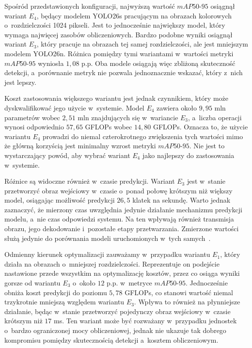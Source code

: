 Spośród przedstawionych konfiguracji, najwyższą wartość $mAP50\text{-}95$ osiągnął wariant $E_4$, będący modelem YOLO26s pracującym na obrazach kolorowych o~rozdzielczości 1024 pikseli. Jest to jednocześnie największy model, który wymaga najwięcej zasobów obliczeniowych. Bardzo podobne wyniki osiągnął wariant $E_3$, który pracuje na obrazach tej samej rozdzielczości, ale jest mniejszym modelem YOLO26n. Różnica pomiędzy tymi wariantami w~wartości metryki $mAP50\text{-}95$ wyniosła $1,08$ p.p. Oba modele osiągają więc zbliżoną skuteczność detekcji, a~porównanie metryk nie pozwala jednoznacznie wskazać, który z~nich jest lepszy.

Koszt zastosowania większego wariantu jest jednak czynnikiem, który może dyskwalifikować jego użycie w~systemie. Model $E_4$ zawiera około $9,95$ mln parametrów wobec $2,51$ mln znajdujących się w~wariancie $E_3$, a~liczba operacji wynosi odpowiednio $57,65$ GFLOPs wobec $14,80$ GFLOPs. Oznacza to, że użycie wariantu $E_4$ prowadzi do niemal czterokrotnego zwiększenia tych wartości mimo że główną korzyścią jest minimalny wzrost metryki $mAP50\text{-}95$. Nie jest to wystarczający powód, aby wybrać wariant $E_4$ jako najlepszy do zastosowania w~systemie.

Różnice są widoczne również w~czasie predykcji. Wariant $E_3$ jest w~stanie przetworzyć obraz wejściowy w~czasie o~ponad połowę krótszym niż większy model, osiągając możliwość predykcji $26,5$ klatek na sekundę. Warto jednak zaznaczyć, że mierzony czas uwzględnia jedynie działanie mechanizmu predykcji modelu, a~nie czas odpowiedzi systemu. Na ten wpływają również transmisja obrazu, jego dekodowanie i~pozostałe etapy przetwarzania. Zmierzone wartości służą jedynie do porównania modeli uruchomionych w~tych samych~.

Odmienny kierunek optymalizacji zauważamy w~przypadku wariantu $E_1$, który działa na obrazach o~mniejszej rozdzielczości. Reprezentuje on podejście nastawione przede wszystkim na optymalizację kosztów, przez co osiąga wyniki gorsze od wariantu $E_3$ o~około $12$ p.p. w~metryce $mAP50\text{-}95$. Jednocześnie obniża koszt predykcji do poziomu $5,78$ GFLOPs, co stanowi wartość niemal trzykrotnie mniejszą względem wariantu $E_3$. Wpływa to również na płynniejsze działanie, będąc w~stanie przetworzyć pojedynczy obraz wejściowy w~czasie krótszym niż $17$ ms. Ten wariant może być rozważany w~przypadku jednostek o~bardzo ograniczonej mocy obliczeniowej, jednak nie ukazuje tak dobrego kompromisu pomiędzy skutecznością detekcji a~kosztem obliczeniowym.

